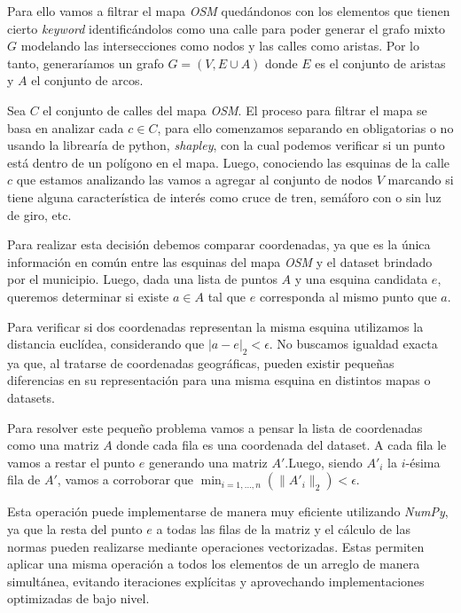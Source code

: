 Para ello vamos a filtrar el mapa \textit{OSM} quedándonos con los elementos que tienen cierto \textit{keyword} identificándolos como una calle para poder generar el grafo mixto $G$ modelando las intersecciones como nodos y las calles como aristas. Por lo tanto, generaríamos un grafo $G = (V, E \cup A)$ donde $E$ es el conjunto de aristas y $A$ el conjunto de arcos.

\vspace{3mm} 

Sea $C$ el conjunto de calles del mapa \textit{OSM}. El proceso para filtrar el mapa se basa en analizar cada $c\in C$, para ello comenzamos separando en obligatorias o no usando la librearía de python, \textit{shapley}, con la cual podemos verificar si un punto está dentro de un polígono en el mapa. Luego, conociendo las esquinas de la calle $c$ que estamos analizando las vamos a agregar al conjunto de nodos $V$ marcando si tiene alguna característica de interés como cruce de tren, semáforo con o sin luz de giro, etc. 

\vspace{3mm}
Para realizar esta decisión debemos comparar coordenadas, ya que es la única información en común entre las esquinas del mapa \textit{OSM} y el dataset brindado por el municipio. Luego, dada una lista de puntos $A$ y una esquina candidata $e$, queremos determinar si existe $a \in A$ tal que $e$ corresponda al mismo punto que $a$.

\vspace{3mm}

Para verificar si dos coordenadas representan la misma esquina utilizamos la distancia euclídea, considerando que $|a - e|_2 < \epsilon$. No buscamos igualdad exacta ya que, al tratarse de coordenadas geográficas, pueden existir pequeñas diferencias en su representación para una misma esquina en distintos mapas o datasets.

\vspace{3mm}

Para resolver este pequeño problema vamos a pensar la lista de coordenadas como una matriz $A$ donde cada fila es una coordenada del dataset. A cada fila le vamos a restar el punto $e$ generando una matriz $A'$.Luego, siendo $A'_i$ la $i$-ésima fila de $A'$, vamos a corroborar que $\min_{i=1,\dots,n}(\|A'_i\|_2) < \epsilon$. 

Esta operación puede implementarse de manera muy eficiente utilizando \textit{NumPy}, ya que la resta del punto $e$ a todas las filas de la matriz y el cálculo de las normas pueden realizarse mediante operaciones vectorizadas. Estas permiten aplicar una misma operación a todos los elementos de un arreglo de manera simultánea, evitando iteraciones explícitas y aprovechando implementaciones optimizadas de bajo nivel.

